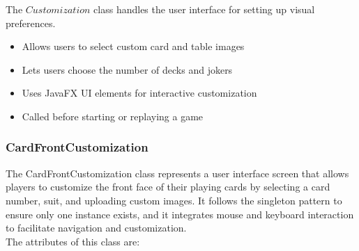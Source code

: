 \documentclass[a4paper]{project}
\begin{document}
				The $Customization$ class handles the user interface for setting up visual preferences.
				
				\begin{itemize}
					\item Allows users to select custom card and table images
					\item Lets users choose the number of decks and jokers
					\item Uses JavaFX UI elements for interactive customization
					\item Called before starting or replaying a game
				\end{itemize}
			
			\subsubsection{CardFrontCustomization}\label{subsubsec:cardfrontcustomization}
			
				The CardFrontCustomization class represents a user interface screen that allows players to customize the front face of their playing cards by selecting a card number, suit, and uploading custom images. It follows the singleton pattern to ensure only one instance exists, and it integrates mouse and keyboard interaction to facilitate navigation and customization. \\
				The attributes of this class are:
			
\end{document}
